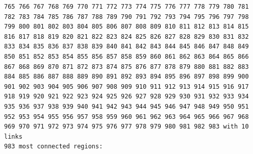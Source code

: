 \documentclass[
  letterpaper,
]{scrbook}
\begin{document}
\begin{verbatim}
765 766 767 768 769 770 771 772 773 774 775 776 777 778 779 780 781 782 783 784 785 786 787 788 789 790 791 792 793 794 795 796 797 798 799 800 801 802 803 804 805 806 807 808 809 810 811 812 813 814 815 816 817 818 819 820 821 822 823 824 825 826 827 828 829 830 831 832 833 834 835 836 837 838 839 840 841 842 843 844 845 846 847 848 849 850 851 852 853 854 855 856 857 858 859 860 861 862 863 864 865 866 867 868 869 870 871 872 873 874 875 876 877 878 879 880 881 882 883 884 885 886 887 888 889 890 891 892 893 894 895 896 897 898 899 900 901 902 903 904 905 906 907 908 909 910 911 912 913 914 915 916 917 918 919 920 921 922 923 924 925 926 927 928 929 930 931 932 933 934 935 936 937 938 939 940 941 942 943 944 945 946 947 948 949 950 951 952 953 954 955 956 957 958 959 960 961 962 963 964 965 966 967 968 969 970 971 972 973 974 975 976 977 978 979 980 981 982 983 with 10 links
983 most connected regions:

\end{verbatim}
\end{document}
